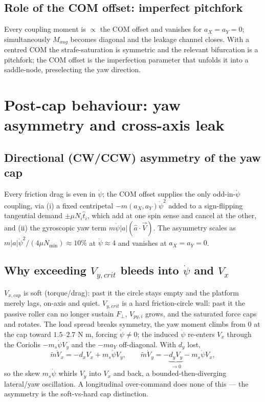 \documentclass[11pt]{article}
\begin{document}
\subsection{Role of the COM offset: imperfect pitchfork}
Every coupling moment is $\propto$ the COM offset and vanishes for $a_X=a_Y=0$; simultaneously
$M_{aug}$ becomes diagonal and the leakage channel closes. With a centred COM the strafe-saturation
is symmetric and the relevant bifurcation is a pitchfork; the COM offset is the imperfection
parameter that unfolds it into a saddle-node, preselecting the yaw direction.

\section{Post-cap behaviour: yaw asymmetry and cross-axis leak}
\subsection{Directional (CW/CCW) asymmetry of the yaw cap}
Every friction drag is even in $\dot\psi$; the COM offset supplies the only odd-in-$\dot\psi$
coupling, via (i) a fixed centripetal $-m(a_X,a_Y)\dot\psi^2$ added to a sign-flipping tangential
demand $\pm\mu N_i\hat t_i$, which add at one spin sense and cancel at the other, and (ii) the
gyroscopic yaw term $m\dot\psi|a|(\hat a\cdot\vec V)$. The asymmetry scales as
$m|a|\dot\psi^2/(4\mu N_{\min})\approx10\%$ at $\dot\psi\approx4$ and vanishes at $a_X=a_Y=0$.

\subsection{Why exceeding $V_{y,crit}$ bleeds into $\dot\psi$ and $V_x$}
$V_{x,cap}$ is soft (torque/drag): past it the circle stays empty and the platform merely lags,
on-axis and quiet. $V_{y,crit}$ is a hard friction-circle wall: past it the passive roller can no
longer sustain $F_\perp$, $V_{py,i}$ grows, and the saturated force caps and rotates. The load
spread breaks symmetry, the yaw moment climbs from $0$ at the cap toward $1.5$--$2.7$ N m, forcing
$\dot\psi\ne0$; the induced $\dot\psi$ re-enters $V_x$ through the Coriolis $-m_s\dot\psi V_y$ and the
$-ma_Y$ off-diagonal. With $d_y$ lost,
\begin{equation}
\tilde m\dot V_x=-d_xV_x+m_s\dot\psi V_y,\qquad \tilde m\dot V_y=-\underbrace{d_yV_y}_{\to0}-m_s\dot\psi V_x,
\end{equation}
so the skew $m_s\dot\psi$ whirls $V_y$ into $V_x$ and back, a bounded-then-diverging lateral/yaw
oscillation. A longitudinal over-command does none of this --- the asymmetry is the soft-vs-hard cap
distinction.
\end{document}
